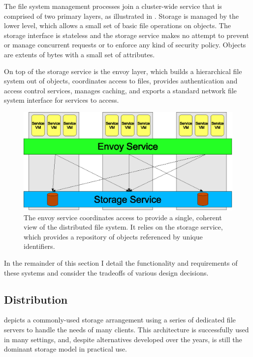The file system management processes join a cluster-wide service that is comprised of two primary layers, as illustrated in . Storage is managed by the lower level, which allows a small set of basic file operations on objects. The storage interface is stateless and the storage service makes no attempt to prevent or manage concurrent requests or to enforce any kind of security policy. Objects are extents of bytes with a small set of attributes.

On top of the storage service is the envoy layer, which builds a hierarchical file system out of objects, coordinates access to files, provides authentication and access control services, manages caching, and exports a standard network file system interface for services to access.

\begin{figure}[t]
\centering
\includegraphics[width=\figwidth]{figures/layers}
\caption[The layers of the Envoy file system]{The envoy service coordinates access to provide a single, coherent view of the distributed file system. It relies on the storage service, which provides a repository of objects referenced by unique identifiers.}
\label{fig:layers}
\end{figure}

In the remainder of this section I detail the functionality and requirements of these systems and consider the tradeoffs of various design decisions.

\subsection{Distribution}

 depicts a commonly-used storage arrangement using a series of dedicated file servers to handle the needs of many clients. This architecture is successfully used in many settings, and, despite alternatives developed over the years, is still the dominant storage model in practical use.

